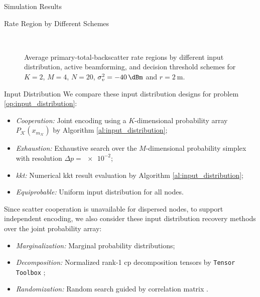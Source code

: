 \documentclass[journal]{IEEEtran}
\begin{document}
\begin{section}{Simulation Results}
	\begin{subsection}{Rate Region by Different Schemes}
		\begin{figure}[!t]
			\centering
			\subfloat[Input Distribution, $Q=1$\label{fg:region_distribution}]{
				\resizebox{0.6\columnwidth}{!}{
					
				}
			}
			\\
			\subfloat[Active Beamforming, $Q=4$\label{fg:region_beamforming}]{
				\resizebox{0.48\columnwidth}{!}{
					
				}
			}
			\subfloat[Decision Threshold, $Q=4$\label{fg:region_threshold}]{
				\resizebox{0.48\columnwidth}{!}{
					
				}
			}
			\caption{
				Average primary-total-backscatter rate regions by different input distribution, active beamforming, and decision threshold schemes for $K=2$, $M=4$, $N=20$, $\sigma_v^2=\qty{-40}{\dBm}$ and $r=\qty{2}{\meter}$.
			}
		\end{figure}
		\begin{subsubsection}{Input Distribution}
			We compare these input distribution designs for problem \eqref{op:input_distribution}:
			\begin{itemize}
				\item \emph{Cooperation:} Joint encoding using a $K$-dimensional probability array $P_{\mathcal{K}}(x_{m_{\mathcal{K}}})$ by Algorithm \ref{al:input_distribution};
				\item \emph{Exhaustion:} Exhaustive search over the $M$-dimensional probability simplex with resolution $\Delta p = \num{e-2}$;
				\item \emph{\gls{kkt}:} Numerical \gls{kkt} result evaluation by Algorithm \ref{al:input_distribution};
				\item \emph{Equiprobable:} Uniform input distribution for all nodes.
			\end{itemize}
			Since scatter cooperation is unavailable for dispersed nodes, to support independent encoding, we also consider these input distribution recovery methods over the joint probability array:
			\begin{itemize}
				\item \emph{Marginalization:} Marginal probability distributions;
				\item \emph{Decomposition:} Normalized rank-\num{1} \gls{cp} decomposition tensors by \texttt{Tensor Toolbox} \cite{Bader2022};
				\item \emph{Randomization:} Random search guided by correlation matrix \cite{Calvo2010}.
			\end{itemize}


\end{subsubsection}
\end{subsection}
\end{section}
\end{document}
